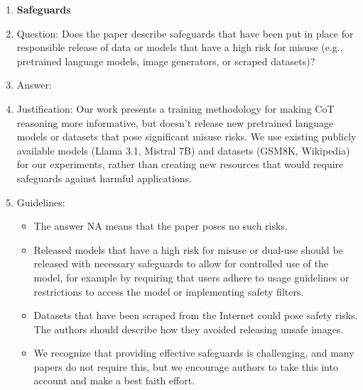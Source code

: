 \documentclass{article}
\begin{document}
\begin{enumerate}
\item {\bf Safeguards}
    \item[] Question: Does the paper describe safeguards that have been put in place for responsible release of data or models that have a high risk for misuse (e.g., pretrained language models, image generators, or scraped datasets)?
    \item[] Answer: \answerNA{} %
    \item[] Justification: Our work presents a training methodology for making CoT reasoning more informative, but doesn't release new pretrained language models or datasets that pose significant misuse risks. We use existing publicly available models (Llama 3.1, Mistral 7B) and datasets (GSM8K, Wikipedia) for our experiments, rather than creating new resources that would require safeguards against harmful applications.
    \item[] Guidelines:
    \begin{itemize}
        \item The answer NA means that the paper poses no such risks.
        \item Released models that have a high risk for misuse or dual-use should be released with necessary safeguards to allow for controlled use of the model, for example by requiring that users adhere to usage guidelines or restrictions to access the model or implementing safety filters. 
        \item Datasets that have been scraped from the Internet could pose safety risks. The authors should describe how they avoided releasing unsafe images.
        \item We recognize that providing effective safeguards is challenging, and many papers do not require this, but we encourage authors to take this into account and make a best faith effort.
    \end{itemize}


\end{enumerate}
\end{document}
